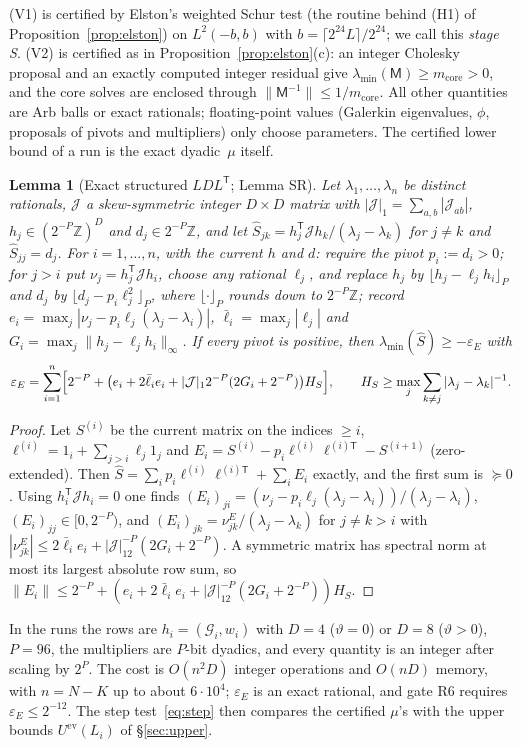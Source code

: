 \documentclass[11pt]{amsart}
\newcommand{\ev}{\mathrm{ev}}
\newcommand{\Tp}{\mathsf T}
\newtheorem{lemma}[theorem]{Lemma}
\theoremstyle{definition}
\theoremstyle{remark}
\numberwithin{equation}{section}
\begin{document}
(V1) is certified by Elston's weighted Schur test (the routine behind (H1) of Proposition~\ref{prop:elston}) on $L^2(-b,b)$ with $b=\lceil2^{24}L\rceil/2^{24}$; we call this \emph{stage S}. (V2) is certified as in Proposition~\ref{prop:elston}(c): an integer Cholesky proposal and an exactly computed integer residual give $\lambda_{\min}(\mathsf M)\ge m_{\mathrm{core}}>0$, and the core solves are enclosed through $\|\mathsf M^{-1}\|\le1/m_{\mathrm{core}}$. All other quantities are Arb balls or exact rationals; floating-point values (Galerkin eigenvalues, $\phi$, proposals of pivots and multipliers) only choose parameters. The certified lower bound of a run is the exact dyadic~$\mu$ itself.

\begin{lemma}[Exact structured $LDL^{\Tp}$; Lemma SR]\label{lem:SR}
Let $\lambda_1,\dots,\lambda_n$ be distinct rationals, $\mathcal J$ a skew-symmetric integer $D\times D$ matrix with $|\mathcal J|_1=\sum_{a,b}|\mathcal J_{ab}|$, $h_j\in(2^{-P}\mathbb Z)^D$ and $d_j\in2^{-P}\mathbb Z$, and let $\hat S_{jk}=h_j^{\Tp}\mathcal Jh_k/(\lambda_j-\lambda_k)$ for $j\ne k$ and $\hat S_{jj}=d_j$. For $i=1,\dots,n$, with the current $h$ and $d$: require the pivot $p_i:=d_i>0$; for $j>i$ put $\nu_j=h_j^{\Tp}\mathcal Jh_i$, choose any rational $\ell_j$, and replace $h_j$ by $\lfloor h_j-\ell_jh_i\rfloor_P$ and $d_j$ by $\lfloor d_j-p_i\ell_j^2\rfloor_P$, where $\lfloor\cdot\rfloor_P$ rounds down to $2^{-P}\mathbb Z$; record $e_i=\max_j|\nu_j-p_i\ell_j(\lambda_j-\lambda_i)|$, $\bar\ell_i=\max_j|\ell_j|$ and $G_i=\max_j\|h_j-\ell_jh_i\|_\infty$. If every pivot is positive, then $\lambda_{\min}(\hat S)\ge-\varepsilon_E$ with
\[
\varepsilon_E=\sum_{i=1}^n\Bigl[2^{-P}+\bigl(e_i+2\bar\ell_ie_i+|\mathcal J|_12^{-P}(2G_i+2^{-P})\bigr)H_S\Bigr],\qquad H_S\ge\max_j\sum_{k\ne j}|\lambda_j-\lambda_k|^{-1}.
\]
\end{lemma}
\begin{proof}
Let $S^{(i)}$ be the current matrix on the indices $\ge i$, $\ell^{(i)}=1_i+\sum_{j>i}\ell_j1_j$ and $E_i=S^{(i)}-p_i\ell^{(i)}\ell^{(i)\Tp}-S^{(i+1)}$ (zero-extended). Then $\hat S=\sum_ip_i\ell^{(i)}\ell^{(i)\Tp}+\sum_iE_i$ exactly, and the first sum is $\succeq0$. Using $h_i^{\Tp}\mathcal Jh_i=0$ one finds $(E_i)_{ji}=(\nu_j-p_i\ell_j(\lambda_j-\lambda_i))/(\lambda_j-\lambda_i)$, $(E_i)_{jj}\in[0,2^{-P})$, and $(E_i)_{jk}=\nu^E_{jk}/(\lambda_j-\lambda_k)$ for $j\ne k>i$ with $|\nu^E_{jk}|\le2\bar\ell_ie_i+|\mathcal J|_12^{-P}(2G_i+2^{-P})$. A symmetric matrix has spectral norm at most its largest absolute row sum, so $\|E_i\|\le2^{-P}+(e_i+2\bar\ell_ie_i+|\mathcal J|_12^{-P}(2G_i+2^{-P}))H_S$.
\end{proof}
In the runs the rows are $h_i=(\mathcal G_i,w_i)$ with $D=4$ ($\vartheta=0$) or $D=8$ ($\vartheta>0$), $P=96$, the multipliers are $P$-bit dyadics, and every quantity is an integer after scaling by $2^P$. The cost is $O(n^2D)$ integer operations and $O(nD)$ memory, with $n=N-K$ up to about $6\cdot10^4$; $\varepsilon_E$ is an exact rational, and gate R6 requires $\varepsilon_E\le2^{-12}$. The step test~\eqref{eq:step} then compares the certified $\mu$'s with the upper bounds $U^\ev(L_i)$ of \S\ref{sec:upper}.
\end{document}
